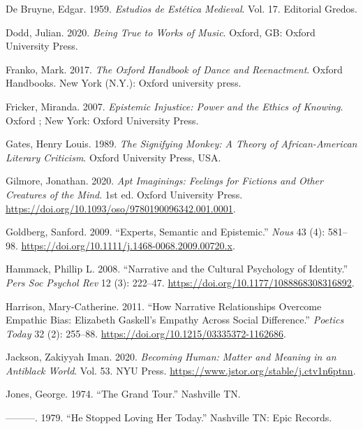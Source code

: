 \documentclass[
  letterpaper,
  DIV=11,
  numbers=noendperiod]{scrreprt}
\newlength{\cslhangindent}
\newenvironment{CSLReferences}[2] %
 {\begin{list}{}{%
  \setlength{\itemindent}{0pt}
  \setlength{\leftmargin}{0pt}
  \setlength{\parsep}{0pt}
  \ifodd #1
   \setlength{\leftmargin}{\cslhangindent}
   \setlength{\itemindent}{-1\cslhangindent}
  \fi
  \setlength{\itemsep}{#2\baselineskip}}}
 {\end{list}}
\begin{document}
\begin{tcolorbox}[enhanced jigsaw, arc=.35mm, breakable, rightrule=.15mm, colback=white, colframe=quarto-callout-important-color-frame, bottomrule=.15mm, leftrule=.75mm, opacityback=0, toprule=.15mm, left=2mm]
\begin{tcolorbox}[enhanced jigsaw, arc=.35mm, breakable, rightrule=.15mm, colback=white, colframe=quarto-callout-tip-color-frame, bottomrule=.15mm, leftrule=.75mm, opacityback=0, toprule=.15mm, left=2mm]
\begin{CSLReferences}{1}{0}
De Bruyne, Edgar. 1959. \emph{Estudios de Est{é}tica Medieval}. Vol. 17.
Editorial Gredos.

Dodd, Julian. 2020. \emph{Being {True} to {Works} of {Music}}. Oxford,
GB: Oxford University Press.

Franko, Mark. 2017. \emph{The {Oxford} Handbook of Dance and
Reenactment}. Oxford Handbooks. New York (N.Y.): Oxford university
press.

Fricker, Miranda. 2007. \emph{Epistemic {Injustice}: {Power} and the
{Ethics} of {Knowing}}. Oxford ; New York: Oxford University Press.

Gates, Henry Louis. 1989. \emph{The {Signifying Monkey}: {A Theory} of
{African-American Literary Criticism}}. Oxford University Press, USA.

Gilmore, Jonathan. 2020. \emph{Apt {Imaginings}: {Feelings} for
{Fictions} and {Other Creatures} of the {Mind}}. 1st ed. Oxford
University Press.
\url{https://doi.org/10.1093/oso/9780190096342.001.0001}.

Goldberg, Sanford. 2009. {``Experts, {Semantic} and {Epistemic}.''}
\emph{Nous} 43 (4): 581--98.
\url{https://doi.org/10.1111/j.1468-0068.2009.00720.x}.

Hammack, Phillip L. 2008. {``Narrative and the {Cultural Psychology} of
{Identity}.''} \emph{Pers Soc Psychol Rev} 12 (3): 222--47.
\url{https://doi.org/10.1177/1088868308316892}.

Harrison, Mary-Catherine. 2011. {``How {Narrative Relationships Overcome
Empathic Bias}: {Elizabeth Gaskell}'s {Empathy} Across {Social
Difference}.''} \emph{Poetics Today} 32 (2): 255--88.
\url{https://doi.org/10.1215/03335372-1162686}.

Jackson, Zakiyyah Iman. 2020. \emph{Becoming {Human}: {Matter} and
{Meaning} in an {Antiblack World}}. Vol. 53. NYU Press.
\url{https://www.jstor.org/stable/j.ctv1n6ptnn}.

Jones, George. 1974. {``The {Grand Tour}.''} Nashville TN.

---------. 1979. {``He {Stopped Loving Her Today}.''} Nashville TN: Epic
Records.


\end{CSLReferences}
\end{tcolorbox}
\end{tcolorbox}
\end{document}
